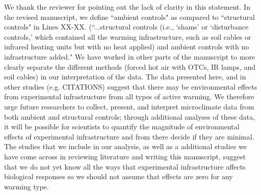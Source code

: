 \documentclass[11pt,a4paper]{letter}
\begin{document}
\begin{letter}{}
\par We thank the reviewer for pointing out the lack of clarity in this statement. In the revised manuscript, we define ``ambient controls" as compared to ``structural controls" in Lines XX-XX. (``...structural controls (i.e., `shams' or `disturbance controls,' which contained all the warming infrastructure, such as soil cables or infrared heating units but with no heat applied) and ambient controls with no infrastructure added." We have worked in other parts of the manuscript to more clearly separate the different methods (forced hot air with OTCs, IR lamps, and soil cables) in our interpretation of the data. The data presented here, and in other studies (e.g. CITATIONS) suggest that there may be environmental effects from experimental infrastructure from all types of active warming. We therefore urge future researchers to collect, present, and interpret microclimate data from both ambient and structural controls; through additional analyses of these data, it will be possible for scientists to quantify the magnitude of environmental effects of experimental infrastructure and from there decide if they are minimal. The studies that we include in our analysis, as well as a additional studies we have come across in reviewing literature and writing this manuscript, suggest that we do not yet know all the ways that experimental infrastructure affects biological responses so we should not assume that effects are zero for any warming type. 


\end{letter}
\end{document}
